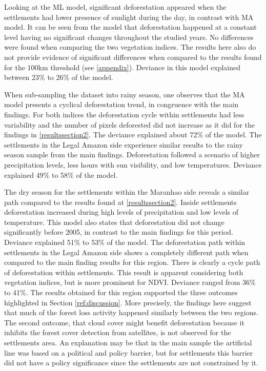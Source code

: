 Looking at the ML model, significant deforestation appeared when the settlements had lower presence of sunlight during the day, in contrast with MA model. It can be seen from the model that deforestation happened at a constant level having no significant changes throughout the studied years. No differences were found when comparing the two vegetation indices. The results here also do not provide evidence of significant differences when compared to the results found for the 100km threshold (see \ref{appendix}). Deviance in this model explained between 23$\%$ to 26$\%$ of the model.

When sub-sampling the dataset into rainy season, one observes that the MA model presents a cyclical deforestation trend, in congruence with the main findings. For both indices the deforestation cycle within settlements had less variability and the number of pixels deforested did not increase as it did for the findings in \ref{resultssection2}. The deviance explained about 72$\%$ of the model. The settlements in the Legal Amazon side experience similar results to the rainy season sample from the main findings. Deforestation followed a scenario of higher precipitation levels, less hours with sun visibility, and low temperatures. Deviance explained 49$\%$ to 58$\%$ of the model. 

The dry season for the settlements within the Maranhao side reveals a similar path compared to the results found at \ref{resultssection2}. Inside settlements deforestation increased during high levels of precipitation and low levels of temperature. This model also states that deforestation did not change significantly before 2005, in contrast to the main findings for this period. Deviance explained 51$\%$ to 53$\%$ of the model. The deforestation path within settlements in the Legal Amazon side shows a completely different path when compared to the main finding results for this region. There is clearly a cycle path of deforestation within settlements. This result is apparent considering both vegetation indices, but is more prominent for NDVI. Deviance ranged from 36$\%$ to 41$\%$. The results obtained for this region supported the three outcomes highlighted in Section \ref{ref:discussion}. More precisely, the findings here suggest that much of the forest loss activity happened similarly between the two regions. The second outcome, that cloud cover might benefit deforestation because it inhibits the forest cover detection from satellites, is not observed for the settlements area. An explanation may be that in the main sample the artificial line was based on a political and policy barrier, but for settlements this barrier did not have a policy significance since the settlements are not constrained by it. 


